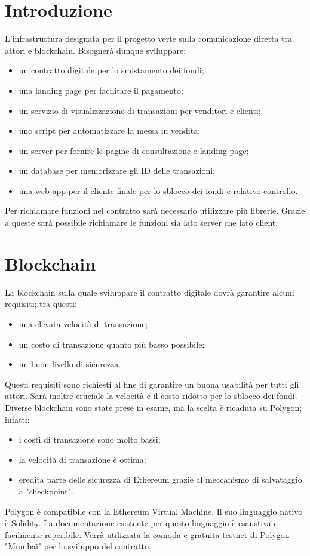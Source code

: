 \documentclass[a4paper, 12pt]{article}
\begin{document}
\makefrontpage

\makeversioni

\section*{Introduzione}
L'infrastruttura designata per il progetto verte sulla comunicazione diretta tra attori e blockchain. Bisognerà dunque sviluppare:
\begin{itemize}
\item un contratto digitale per lo smistamento dei fondi;
\item una landing page per facilitare il pagamento;
\item un servizio di visualizzazione di transazioni per venditori e clienti;
\item uno script per automatizzare la messa in vendita;
\item un server per fornire le pagine di consultazione e landing page;
\item un database per memorizzare gli ID delle transazioni;
\item una web app per il cliente finale per lo sblocco dei fondi e relativo controllo.
\end{itemize}
Per richiamare funzioni nel contratto sarà necessario utilizzare più librerie. Grazie a queste sarà possibile richiamare le funzioni sia lato server che lato client.

\section*{Blockchain}
La blockchain sulla quale sviluppare il contratto digitale dovrà garantire alcuni requisiti; tra questi:
\begin{itemize}
\item una elevata velocità di transazione;
\item un costo di transazione quanto più basso possibile;
\item un buon livello di sicurezza.
\end{itemize}
Questi requisiti sono richiesti al fine di garantire un buona usabilità per tutti gli attori.
Sarà inoltre cruciale la velocità e il costo ridotto per lo sblocco dei fondi.
Diverse blockchain sono state prese in esame, ma la scelta è ricaduta su Polygon; infatti:
\begin{itemize}
\item i costi di transazione sono molto bassi;
\item la velocità di transazione è ottima;
\item eredita parte delle sicurezza di Ethereum grazie al meccanismo di salvataggio a "checkpoint".
\end{itemize}
Polygon è compatibile con la Ethereum Virtual Machine. Il suo linguaggio nativo è Solidity. La documentazione esistente per questo linguaggio è esaustiva e facilmente reperibile. Verrà utilizzata la comoda e gratuita testnet di Polygon "Mumbai" per lo sviluppo del contratto.
\end{document}
